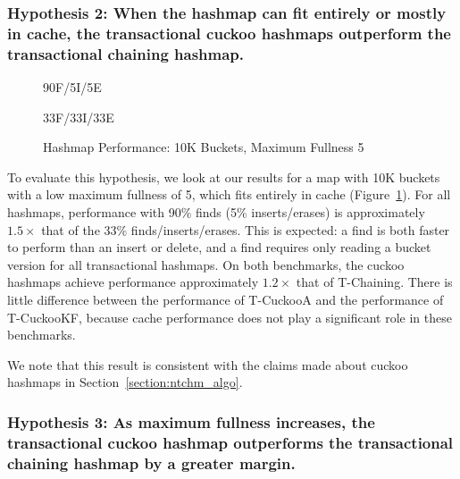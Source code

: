 \subsubsection{Hypothesis 2: When the hashmap can fit entirely or mostly in cache, the transactional cuckoo hashmaps outperform the transactional chaining hashmap.}

\begin{figure}[H]
    \centering
    \begin{minipage}{0.75\textwidth}
	\caption*{90F/5I/5E}
        \vspace{12pt}
    \end{minipage}
    \begin{minipage}{0.75\textwidth}
	\caption*{33F/33I/33E}
    \end{minipage}
    \caption{Hashmap Performance: 10K Buckets, Maximum Fullness 5}
    \label{fig:hm_5}
\end{figure}

To evaluate this hypothesis, we look at our results for a map with 10K buckets with a low maximum fullness of 5, which fits entirely in cache (Figure~\ref{fig:hm_5}).
For all hashmaps, performance with 90\% finds (5\% inserts/erases) is approximately $1.5\times$ that of the 33\% finds/inserts/erases. This is expected: a find is both faster to perform than an insert or delete, and a find requires only reading a bucket version for all transactional hashmaps.
On both benchmarks, the cuckoo hashmaps achieve performance approximately $1.2\times$ that of T-Chaining. There is little difference between the performance of T-CuckooA and the performance of T-CuckooKF, because cache performance does not play a significant role in these benchmarks.

We note that this result is consistent with the claims made about cuckoo hashmaps in Section~\ref{section:ntchm_algo}.


\vspace{12pt}
\noindent{}


\subsubsection{Hypothesis 3: As maximum fullness increases, the transactional cuckoo hashmap outperforms the transactional chaining hashmap by a greater margin.}

